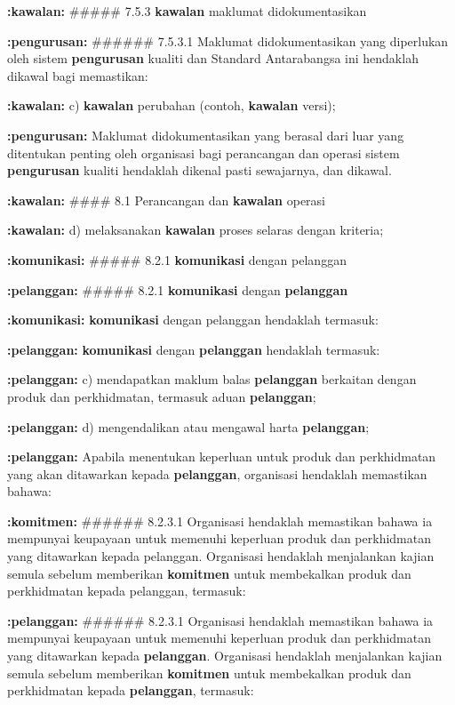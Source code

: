 \documentclass{article}
\begin{document}
\textbf{:kawalan:} \#\#\#\#\# 7.5.3 \textbf{kawalan} maklumat didokumentasikan

\textbf{:pengurusan:} \#\#\#\#\#\# 7.5.3.1 Maklumat didokumentasikan yang diperlukan oleh sistem \textbf{pengurusan} kualiti dan
Standard Antarabangsa ini hendaklah dikawal bagi memastikan:

\textbf{:kawalan:} c) \textbf{kawalan} perubahan (contoh, \textbf{kawalan} versi);

\textbf{:pengurusan:} Maklumat didokumentasikan yang berasal dari luar yang ditentukan penting oleh organisasi
bagi perancangan dan operasi sistem \textbf{pengurusan} kualiti hendaklah dikenal pasti sewajarnya,
dan dikawal.

\textbf{:kawalan:} \#\#\#\# 8.1 Perancangan dan \textbf{kawalan} operasi

\textbf{:kawalan:} d) melaksanakan \textbf{kawalan} proses selaras dengan kriteria;

\textbf{:komunikasi:} \#\#\#\#\# 8.2.1 \textbf{komunikasi} dengan pelanggan

\textbf{:pelanggan:} \#\#\#\#\# 8.2.1 \textbf{komunikasi} dengan \textbf{pelanggan}

\textbf{:komunikasi:} \textbf{komunikasi} dengan pelanggan hendaklah termasuk:

\textbf{:pelanggan:} \textbf{komunikasi} dengan \textbf{pelanggan} hendaklah termasuk:

\textbf{:pelanggan:} c) mendapatkan maklum balas \textbf{pelanggan} berkaitan dengan produk dan perkhidmatan,
termasuk aduan \textbf{pelanggan};

\textbf{:pelanggan:} d) mengendalikan atau mengawal harta \textbf{pelanggan};

\textbf{:pelanggan:} Apabila menentukan keperluan untuk produk dan perkhidmatan yang akan ditawarkan
kepada \textbf{pelanggan}, organisasi hendaklah memastikan bahawa:

\textbf{:komitmen:} \#\#\#\#\#\# 8.2.3.1 Organisasi hendaklah memastikan bahawa ia mempunyai keupayaan untuk
memenuhi keperluan produk dan perkhidmatan yang ditawarkan kepada pelanggan.
Organisasi hendaklah menjalankan kajian semula sebelum memberikan \textbf{komitmen} untuk
membekalkan produk dan perkhidmatan kepada pelanggan, termasuk:

\textbf{:pelanggan:} \#\#\#\#\#\# 8.2.3.1 Organisasi hendaklah memastikan bahawa ia mempunyai keupayaan untuk
memenuhi keperluan produk dan perkhidmatan yang ditawarkan kepada \textbf{pelanggan}.
Organisasi hendaklah menjalankan kajian semula sebelum memberikan \textbf{komitmen} untuk
membekalkan produk dan perkhidmatan kepada \textbf{pelanggan}, termasuk:
\end{document}
